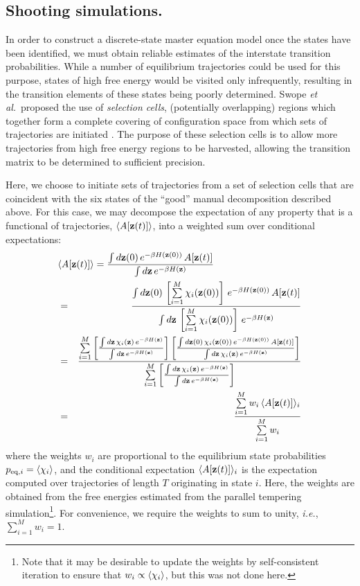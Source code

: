 \subsection{Shooting simulations.}
\label{validation:section:shooting-simulations}

In order to construct a discrete-state master equation model once the states have been identified, we must obtain reliable estimates of the interstate transition probabilities. 
While a number of equilibrium trajectories could be used for this purpose, states of high free energy would be visited only infrequently, resulting in the transition elements of these states being poorly determined.
Swope \emph{et al.}\ proposed the use of \emph{selection cells}, (potentially overlapping) regions which together form a complete covering of configuration space from which sets of trajectories are initiated \cite{swope:2004a}.
The purpose of these selection cells is to allow more trajectories from high free energy regions to be harvested, allowing the transition matrix to be determined to sufficient precision.

Here, we choose to initiate sets of trajectories from a set of selection cells that are coincident with the six states of the ``good'' manual decomposition described above.
For this case, we may decompose the expectation of any property that is a functional of trajectories, $\langle A[{\bf z}(t)] \rangle$, into a weighted sum over conditional expectations:
\begin{eqnarray}
\lefteqn{\expect{A[\z(t)]} = \frac{\int d\z(0) \, e^{-\beta H(\z(0))} \, A[\z(t)]}{\int d\z \, e^{-\beta H(\z)}}} \nonumber \\
&=& \frac{\int d\z(0) \, \left[ \sum\limits_{i=1}^M \chi_i(\z(0)) \right] \, e^{-\beta H(\z(0))} \, A[\z(t)]}{\int d\z \, \left[ \sum\limits_{i=1}^M \chi_i(\z(0)) \right] \, e^{-\beta H(\z)}} \nonumber \\
&=& \frac{\sum\limits_{i=1}^M \left[ \frac{\int d\z \, \chi_i(\z) \, e^{-\beta H(\z)}}{\int d\z \, e^{-\beta H(\z)}} \right] \left[ \frac{\int d\z(0) \, \chi_i(\z(0)) \, e^{-\beta H(\z(0))} \, A[\z(t)]}{\int d\z \, \chi_i(\z) \, e^{-\beta H(\z)}} \right]}{\sum\limits_{i=1}^M \left[ \frac{\int d\z \, \chi_i(\z) \, e^{-\beta H(\z)}}{\int d\z \, e^{-\beta H(\z)}} \right]} \nonumber \\
&=& \frac{\sum\limits_{i=1}^M w_i \, \expect{A[\z(t)]}_i}{\sum\limits_{i=1}^M w_i} \label{validation:equation:selection-cell-expectation}
\end{eqnarray}
where the weights $w_i$ are proportional to the equilibrium state probabilities $p_{\mathrm{eq},i} = \langle \chi_i \rangle$, and the conditional expectation $\langle A[{\bf z}(t)] \rangle_i$ is the expectation computed over trajectories of length $T$ originating in state $i$.
Here, the weights are obtained from the free energies estimated from the parallel tempering simulation\footnote{Note that it may be desirable to update the weights by self-consistent iteration to ensure that $w_i \propto \langle \chi_i \rangle$, but this was not done here.}.
For convenience, we require the weights to sum to unity, \emph{i.e.}, $\sum_{i=1}^M w_i = 1$.

